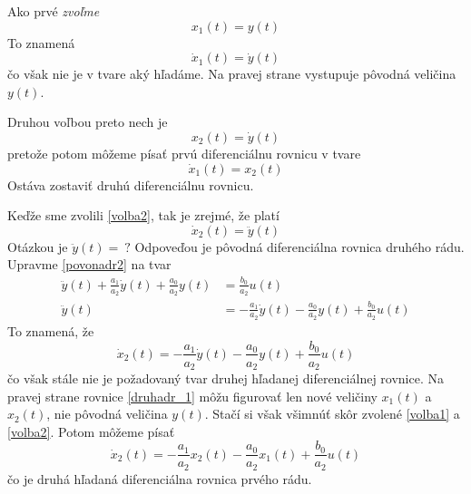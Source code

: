 \documentclass[a4paper, 10pt, ]{article}
\begin{document}
Ako prvé \emph{zvoľme}
\begin{equation} \label{volba1}
    x_1(t) = y(t)
\end{equation}
To znamená
\begin{equation}
    \dot x_1(t) = \dot y(t)
\end{equation}
čo však nie je v tvare aký hľadáme. Na pravej strane vystupuje pôvodná veličina $y(t)$.

Druhou voľbou preto nech je
\begin{equation} \label{volba2}
    x_2(t) = \dot y(t)
\end{equation}
pretože potom môžeme písať prvú diferenciálnu rovnicu v tvare
\begin{equation}
    \dot x_1(t) = x_2(t)
\end{equation}
Ostáva zostaviť druhú diferenciálnu rovnicu. 

Keďže sme zvolili \eqref{volba2}, tak je zrejmé, že platí
\begin{equation} 
    \dot x_2(t) = \ddot y(t)
\end{equation}
Otázkou je $\ddot y(t) = \ ?$ Odpoveďou je pôvodná diferenciálna rovnica druhého rádu. Upravme \eqref{povonadr2} na tvar
\begin{align}
     \ddot y(t) + \frac{a_1}{a_2} \dot y(t) + \frac{a_0}{a_2} y(t) &= \frac{b_0}{a_2} u(t) \\
     \ddot y(t) &= - \frac{a_1}{a_2} \dot y(t) - \frac{a_0}{a_2} y(t) +  \frac{b_0}{a_2} u(t) 
\end{align}
To znamená, že
\begin{equation}  \label{druhadr_1}
    \dot x_2(t) = - \frac{a_1}{a_2} \dot y(t) - \frac{a_0}{a_2} y(t) +  \frac{b_0}{a_2} u(t) 
\end{equation}
čo však stále nie je požadovaný tvar druhej hľadanej diferenciálnej rovnice. Na pravej strane rovnice \eqref{druhadr_1} môžu figurovať len nové veličiny $x_1(t)$ a $x_2(t)$, nie pôvodná veličina $y(t)$. Stačí si však všimnúť skôr zvolené \eqref{volba1} a \eqref{volba2}. Potom môžeme písať
\begin{equation}  \label{druhadr_2}
    \dot x_2(t) = - \frac{a_1}{a_2}  x_2(t) - \frac{a_0}{a_2} x_1(t) +  \frac{b_0}{a_2} u(t) 
\end{equation}
čo je druhá hľadaná diferenciálna rovnica prvého rádu.
\end{document}
